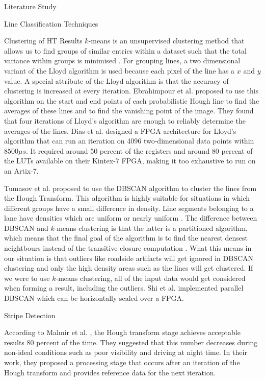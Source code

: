 \documentclass{matthijs}
\begin{document}
\begin{hoofdstuk}{Literature Study}
\begin{paragraaf}{Line Classification Techniques}
\begin{subparagraaf}{Clustering of HT Results}
				$k$-means is an unsupervised clustering method that allows us to find groups of similar entries within a dataset such that the total variance within groups is minimised \cite{martin2019implementing}.
				For grouping lines, a two dimensional variant of the Lloyd algorithm is used because each pixel of the line has a $x$ and $y$ value.
				A special attribute of the Lloyd algorithm is that the accuracy of clustering is increased at every iteration.
				Ebrahimpour et al. \cite{ebrahimpour2012vanishing} proposed to use this algorithm on the start and end points of each probabilistic Hough line to find the averages of these lines and to find the vanishing point of the image.
				They found that four iterations of Lloyd's algorithm are enough to reliably determine the averages of the lines.
				Dias et al. \cite{dias2020parallel} designed a FPGA architecture for Lloyd's algorithm that can run an iteration on 4096 two-dimensional data points within $8500 \mu s$.
				It required around 50 percent of the registers and around 80 percent of the LUTs available on their Kintex-7 FPGA, making it too exhaustive to run on an Artix-7.

				\bigskip

				Tumasov et al. \cite{tumasov2021research} proposed to use the DBSCAN algorithm to cluster the lines from the Hough Transform.
				This algorithm is highly suitable for situations in which different groups have a small difference in density.
				Line segments belonging to a lane have densities which are uniform or nearly uniform \cite{niu2016robust}.
				The difference between DBSCAN and $k$-means clustering is that the latter is a partitioned algorithm, which means that the final goal of the algorithm is to find the nearest densest neightbours instead of the transitive closure computation \cite{shi2014fpga}.
				What this means in our situation is that outliers like roadside artifacts will get ignored in DBSCAN clustering and only the high density areas such as the lines will get clustered.
				If we were to use $k$-means clustering, all of the input data would get considered when forming a result, including the outliers.
				Shi et al. \cite{shi2014fpga} implemented parallel DBSCAN which can be horizontally scaled over a FPGA.

			\end{subparagraaf}

			\begin{subparagraaf}{Stripe Detection}

				According to Malmir et al. \cite{malmir2019design}, the Hough transform stage achieves acceptable results 80 percent of the time.
				They suggested that this number decreases during non-ideal conditions such as poor visibility and driving at night time.
				In their work, they proposed a processing stage that occurs after an iteration of the Hough transform and provides reference data for the next iteration.


\end{subparagraaf}
\end{paragraaf}
\end{hoofdstuk}
\end{document}
